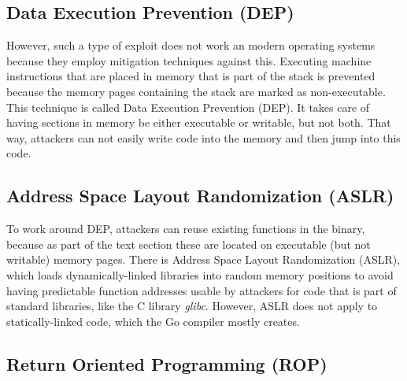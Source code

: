 



\subsection{Data Execution Prevention (DEP)}\label{subsec:background:exploit-techniques:dep}

However, such a type of exploit does not work an modern operating systems because they employ mitigation techniques
against this.
Executing machine instructions that are placed in memory that is part of the stack is prevented because the memory pages
containing the stack are marked as non-executable.
This technique is called Data Execution Prevention (\acrshort{DEP}).
It takes care of having sections in memory be either executable or writable, but not both.
That way, attackers can not easily write code into the memory and then jump into this code.



\subsection{Address Space Layout Randomization (ASLR)}\label{subsec:background:exploit-techniques:aslr}

To work around \acrshort{DEP}, attackers can reuse existing functions in the binary, because as part of the text section
these are located on executable (but not writable) memory pages.
There is Address Space Layout Randomization (\acrshort{ASLR}), which loads dynamically-linked libraries into random
memory positions to avoid having predictable function addresses usable by attackers for code that is part of standard
libraries, like the C library \textit{glibc}.
However, \acrshort{ASLR} does not apply to statically-linked code, which the Go compiler mostly creates.



\subsection{Return Oriented Programming (ROP)}\label{subsec:background:exploit-techniques:rop}

